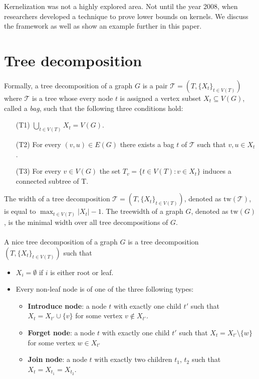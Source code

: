 \documentclass[en]{pracamgr}
\begin{document}
Kernelization was not a highly explored area. Not until the year 2008, when researchers developed a technique to prove lower bounds on kernels. We discuss the framework as well as show an example further in this paper.

\section{Tree decomposition}

Formally, a tree decomposition of a graph $G$ is a pair $\mathcal{T} = (T, \{X_t\}_{t\in V(T)})$ where $\mathcal{T}$ is a tree whose every node $t$ is assigned a vertex subset $X_t \subseteq V(G)$, called a \emph{bag}, such that the following three conditions hold:
\begin{itemize}
	\item[(T1)] $\bigcup_{t\in V(T)}X_t = V(G)$.
	\item[(T2)] For every $(v,u) \in E(G)$ there exists a bag $t$ of $\mathcal{T}$ such that $v,u \in X_t$.
	\item[(T3)] For every $v \in V(G)$ the set $T_v = \{t \in V(T): v \in X_t\}$ induces a connected subtree of T.
\end{itemize}

The width of a tree decomposition $\mathcal{T} = (T,\{X_t\}_{t\in V(T)})$, denoted as $\textrm{tw}(\mathcal{T})$, is equal to $\max_{t \in V(T)} |X_t| - 1$. The treewidth of a graph $G$, denoted as $\textrm{tw}(G)$, is the minimal width over all tree decompositions of $G$.
\\\\
A nice tree decomposition of a graph $G$ is a tree decomposition $(T, \{X_t\}_{t \in V(T)})$ such that
\begin{itemize}
	\item $X_i = \emptyset$ if $i$ is either root or leaf.
	\item Every non-leaf node is of one of the three following types:
	\begin{itemize}
		\item \textbf{Introduce node}: a node $t$ with exactly one child $t'$ such that $X_t = X_{t'} \cup \{v\}$ for some vertex $v \notin X_{t'}$.
		\item \textbf{Forget node}: a node $t$ with exactly one child $t'$ such that $X_t = X_{t'} \setminus \{w\}$ for some vertex $w \in X_{t'}$
		\item \textbf{Join node}: a node $t$ with exactly two children $t_1$, $t_2$ such that $X_t = X_{t_1} = X_{t_2}$.
	\end{itemize}
\end{itemize}
\end{document}
